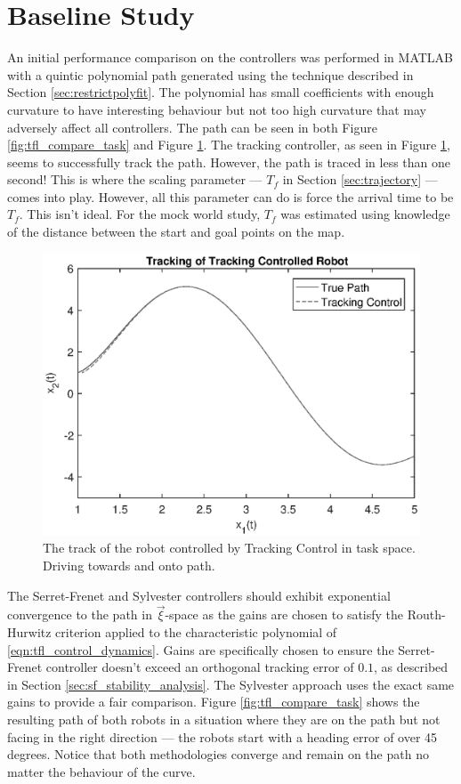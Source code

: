 \section{Baseline Study}
An initial performance comparison on the controllers was performed in MATLAB with a quintic polynomial path generated using the technique described in Section \ref{sec:restrictpolyfit}. The polynomial has small coefficients with enough curvature to have interesting behaviour but not too high curvature that may adversely affect all controllers. The path can be seen in both Figure \ref{fig:tfl_compare_task} and Figure \ref{fig:track}. The tracking controller, as seen in Figure \ref{fig:track}, seems to successfully track the path. However, the path is traced in less than one second! This is where the scaling parameter --- $T_f$ in Section \ref{sec:trajectory} --- comes into play. However, all this parameter can do is force the arrival time to be $T_f$. This isn't ideal. For the mock world study, $T_f$ was estimated using knowledge of the distance between the start and goal points on the map.
\begin{figure}[H]
    \centering
    \includegraphics{images/tracking_control.eps}
    \caption{The track of the robot controlled by Tracking Control in task space. Driving towards and onto path.}
    \label{fig:track}
\end{figure}
The Serret-Frenet and Sylvester controllers should exhibit exponential convergence to the path in $\vec{\xi}$-space as the gains are chosen to satisfy the Routh-Hurwitz criterion applied to the characteristic polynomial of \eqref{eqn:tfl_control_dynamics}. Gains are specifically chosen to ensure the Serret-Frenet controller doesn't exceed an orthogonal tracking error of $0.1$, as described in Section \ref{sec:sf_stability_analysis}. The Sylvester approach uses the exact same gains to provide a fair comparison. Figure \ref{fig:tfl_compare_task} shows the resulting path of both robots in a situation where they are on the path but not facing in the right direction --- the robots start with a heading error of over 45 degrees. Notice that both methodologies converge and remain on the path no matter the behaviour of the curve.
